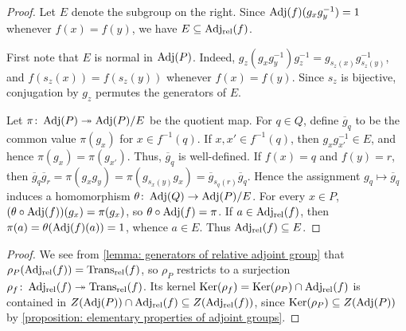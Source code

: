 \begin{proof}
Let $E$ denote the subgroup on the right. Since $\operatorname{Adj}(f)(g_{x}g_{y}^{-1})=1$ whenever $f(x)=f(y)$, we have $E\subseteq\operatorname{Adj_{rel}}(f)$.

First note that $E$ is normal in $\operatorname{Adj}(P)$. Indeed, $g_{z}(g_{x}g_{y}^{-1})g_{z}^{-1}=g_{s_z(x)}g_{s_z(y)}^{-1}$, and $f(s_z(x))=f(s_z(y))$ whenever $f(x)=f(y)$. Since $s_z$ is bijective, conjugation by $g_{z}$ permutes the generators of $E$.

Let $\pi\colon\operatorname{Adj}(P)\twoheadrightarrow\operatorname{Adj}(P)/E$ be the quotient map. For $q\in Q$, define $\overline{g}_{q}$ to be the common value $\pi(g_{x})$ for $x\in f^{-1}(q)$. If $x,x'\in f^{-1}(q)$, then $g_xg_{x'}^{-1}\in E$, and hence $\pi(g_x)=\pi(g_{x'})$. Thus, $\overline{g}_q $ is well-defined. If $f(x)=q$ and $f(y)=r$, then $\overline{g}_{q}\overline{g}_{r} =\pi(g_{x}g_{y}) =\pi(g_{s_x(y)}g_{x}) =\overline{g}_{s_q(r)}\overline{g}_{q}$.
Hence the assignment $g_{q}\mapsto\overline{g}_{q}$ induces a homomorphism $\theta\colon\operatorname{Adj}(Q)\to\operatorname{Adj}(P)/E$. For every $x\in P$, $(\theta\circ\operatorname{Adj}(f))(g_{x})=\pi(g_{x})$, so $\theta\circ\operatorname{Adj}(f)=\pi$. If $a\in\operatorname{Adj_{rel}}(f)$, then $\pi(a)=\theta(\operatorname{Adj}(f)(a))=1$, whence $a\in E$. Thus $\operatorname{Adj_{rel}}(f)\subseteq E$.
\end{proof}


\begin{proof}
We see from \cref{lemma: generators of relative adjoint group} that $\rho_{P}(\operatorname{Adj_{rel}}(f))=\operatorname{Trans_{rel}}(f)$, so $\rho_{P}$ restricts to a surjection $\rho_{f}\colon \operatorname{Adj_{rel}}(f)\twoheadrightarrow \operatorname{Trans_{rel}}(f)$. Its kernel $\operatorname{Ker}(\rho_f)= \operatorname{Ker}(\rho_{P}) \cap \operatorname{Adj_{rel}}(f)$ is contained in $Z(\operatorname{Adj}(P))\cap \operatorname{Adj_{rel}}(f) \subseteq Z(\operatorname{Adj_{rel}}(f))$, since $\operatorname{Ker}(\rho_P) \subseteq Z(\operatorname{Adj}(P))$ by \cref{proposition: elementary properties of adjoint groups}.
\end{proof}


